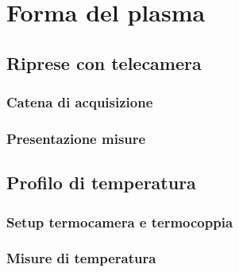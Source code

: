 \chapter{Forma del plasma}
\label{ch:forma}

\section{Riprese con telecamera}

\subsection{Catena di acquisizione}

\subsection{Presentazione misure}

\section{Profilo di temperatura}

\subsection{Setup termocamera e termocoppia}

\subsection{Misure di temperatura}
